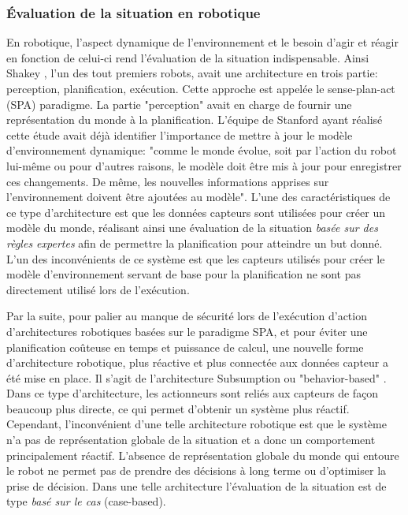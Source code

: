 \documentclass[a4paper,11pt,twoside]{StyleThese}
\begin{document}
\subsubsection{Évaluation de la situation en robotique}
En robotique, l'aspect dynamique de l'environnement et le besoin d'agir et réagir en fonction de celui-ci rend l'évaluation de la situation indispensable. Ainsi Shakey \cite{nilsson1969mobile}, l'un des tout premiers robots, avait une architecture en trois partie: perception, planification, exécution. Cette approche est appelée le sense-plan-act (SPA) paradigme.
La partie "perception" avait en charge de fournir une représentation du monde à la planification.
L'équipe de Stanford ayant réalisé cette étude avait déjà identifier l'importance de mettre à jour le modèle d'environnement dynamique: "comme le monde évolue, soit par l'action du robot lui-même ou pour d'autres raisons, le modèle doit être mis à jour pour enregistrer ces changements. De même, les nouvelles informations apprises sur l'environnement doivent être ajoutées au modèle".
L'une des caractéristiques de ce type d'architecture est que les données capteurs sont utilisées pour créer un modèle du monde, réalisant ainsi une évaluation de la situation \textit{basée sur des règles expertes} afin de permettre la planification pour atteindre un but donné. L'un des inconvénients de ce système est que les capteurs utilisés pour créer le modèle d'environnement servant de base pour la planification ne sont pas directement utilisé lors de l'exécution.

Par la suite, pour palier au manque de sécurité lors de l'exécution d'action d'architectures robotiques basées sur le paradigme SPA, et pour éviter une planification coûteuse en temps et puissance de calcul,
une nouvelle forme d'architecture robotique, plus réactive et plus connectée aux données capteur a été mise en place. Il s'agit de l'architecture Subsumption ou "behavior-based" \cite{brooks1986robust}. Dans ce type d'architecture, les actionneurs sont reliés aux capteurs de façon beaucoup plus directe, ce qui permet d'obtenir un système plus réactif. Cependant, l'inconvénient d'une telle architecture robotique est que le système n'a pas de représentation globale de la situation et a donc un comportement principalement réactif. L'absence de représentation globale du monde qui entoure le robot ne permet pas de prendre des décisions à long terme ou d'optimiser la prise de décision. Dans une telle architecture l'évaluation de la situation est de type \textit{basé sur le cas} (case-based).
\end{document}
